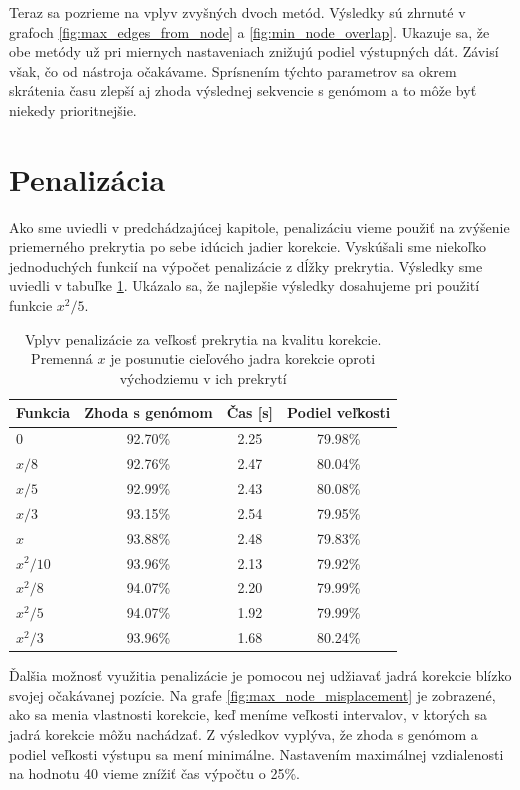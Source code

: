Teraz sa pozrieme na vplyv zvyšných dvoch metód. Výsledky sú zhrnuté v grafoch \ref{fig:max_edges_from_node} a \ref{fig:min_node_overlap}. Ukazuje sa, že obe metódy už pri miernych nastaveniach znižujú podiel výstupných dát. Závisí však, čo od nástroja očakávame. Sprísnením týchto parametrov sa okrem skrátenia času zlepší aj zhoda výslednej sekvencie s genómom a to môže byť niekedy prioritnejšie.


\section{Penalizácia}

Ako sme uviedli v predchádzajúcej kapitole, penalizáciu vieme použiť na zvýšenie priemerného prekrytia po sebe idúcich jadier korekcie. Vyskúšali sme niekoľko jednoduchých funkcií na výpočet penalizácie z dĺžky prekrytia. Výsledky sme uviedli v tabuľke \ref{penalizacia_za_prekrytie}. Ukázalo sa, že najlepšie výsledky dosahujeme pri použití funkcie $x^2/5$.

\begin{table}[H]
    \fontsize{11}{13}\selectfont
    \centering
    \begin{tabular}{ | l || c | c | c | }
    \hline 
Funkcia& Zhoda s genómom & Čas [s] & Podiel veľkosti \\ \hline \hline
$0$ & 92.70\% & 2.25 & 79.98\% \\ \hline
$x/8$ & 92.76\% & 2.47 & 80.04\% \\ \hline
$x/5$ & 92.99\% & 2.43 & 80.08\% \\ \hline
$x/3$ & 93.15\% & 2.54 & 79.95\% \\ \hline
$x$ & 93.88\% & 2.48 & 79.83\% \\ \hline
$x^2/10$ & 93.96\% & 2.13 & 79.92\% \\ \hline
$x^2/8$ & 94.07\% & 2.20 & 79.99\% \\ \hline
$x^2/5$ & 94.07\% & 1.92 & 79.99\% \\ \hline
$x^2/3$ & 93.96\% & 1.68 & 80.24\% \\ \hline
    \end{tabular}
    \caption{Vplyv penalizácie za veľkosť prekrytia na kvalitu korekcie. Premenná $x$ je posunutie cieľového jadra korekcie oproti východziemu v ich prekrytí}
    \label{penalizacia_za_prekrytie}
\end{table}

Ďalšia možnosť využitia penalizácie je pomocou nej udžiavať jadrá korekcie blízko svojej očakávanej pozície. Na grafe \ref{fig:max_node_misplacement} je zobrazené, ako sa menia vlastnosti korekcie, keď meníme veľkosti intervalov, v ktorých sa jadrá korekcie môžu nachádzať. Z výsledkov vyplýva, že zhoda s genómom a podiel veľkosti výstupu sa mení minimálne. Nastavením maximálnej vzdialenosti na hodnotu 40 vieme znížiť čas výpočtu o 25\%.

